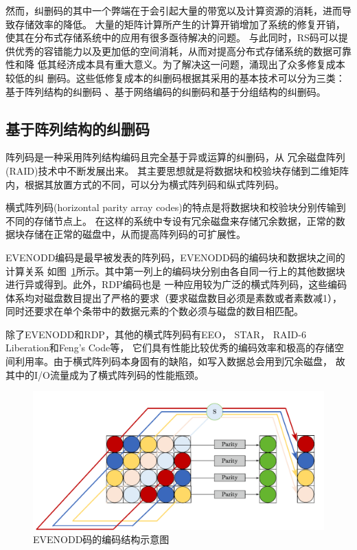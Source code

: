然而，纠删码的其中一个弊端在于会引起大量的带宽以及计算资源的消耗，进而导致存储效率的降低。
大量的矩阵计算所产生的计算开销增加了系统的修复开销，
使其在分布式存储系统中的应用有很多亟待解决的问题。
与此同时，RS码可以提供优秀的容错能力以及更加低的空间消耗，从而对提高分布式存储系统的数据可靠性和降
低其经济成本具有重大意义。为了解决这一问题，涌现出了众多修复成本较低的纠
删码。这些低修复成本的纠删码根据其采用的基本技术可以分为三类：基于阵列结构的纠删码
、基于网络编码的纠删码和基于分组结构的纠删码。

\subsection{基于阵列结构的纠删码}
阵列码是一种采用阵列结构编码且完全基于异或运算的纠删码，从
冗余磁盘阵列(RAID)\cite{patterson1988case}技术中不断发展出来。
其主要思想就是将数据块和校验块存储到二维矩阵内，根据其放置方式的不同，可以分为横式阵列码和纵式阵列码。

横式阵列码(horizontal parity array codes)的特点是将数据块和校验块分别传输到不同的存储节点上。
在这样的系统中专设有冗余磁盘来存储冗余数据，正常的数据块存储在正常的磁盘中，从而提高阵列码的可扩展性。


EVENODD编码\cite{blaum1995evenodd}是最早被发表的阵列码，EVENODD码的编码块和数据块之间的计算关系
如图~\ref{fig:con-1.4}所示。其中第一列上的编码块分别由各自同一行上的其他数据块进行异或得到。此外，RDP\cite{corbett2004row}编码也是
一种应用较为广泛的横式阵列码，这些编码体系均对磁盘数目提出了严格的要求（要求磁盘数目必须是素数或者素数减1），
同时还要求在单个条带中的数据元素的个数必须与磁盘的数目相匹配。

除了EVENODD和RDP，其他的横式阵列码有EEO\cite{feng2010eeo}，
STAR\cite{huang2008star}，
RAID-6 Liberation\cite{plank2009raid}和Feng's Code\cite{feng2005new}等，
它们具有性能比较优秀的编码效率和极高的存储空间利用率。由于横式阵列码本身固有的缺陷，如写入数据总会用到冗余磁盘，
故其中的I/O流量成为了横式阵列码的性能瓶颈。


\begin{figure}[htbp]
	\centering
	\includegraphics [scale=0.7]{figures/1.4.pdf}
	\caption{EVENODD码的编码结构示意图}
	\label{fig:con-1.4}
\end{figure}

